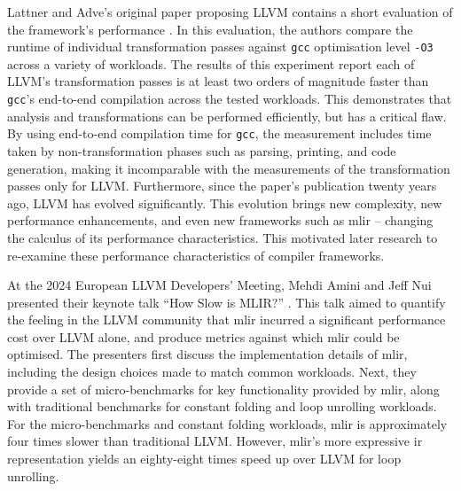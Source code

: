 Lattner and Adve's original paper proposing LLVM contains a short evaluation of the framework's performance \cite[Section 4.1.4]{lattnerLLVMCompilationFramework2004}.
In this evaluation, the authors compare the runtime of individual transformation passes against \texttt{gcc} optimisation level \texttt{-O3} across a variety of workloads.
The results of this experiment \cite[Table 2]{lattnerLLVMCompilationFramework2004} report each of LLVM's transformation passes is at least two orders of magnitude faster than \texttt{gcc}'s end-to-end compilation across the tested workloads. This demonstrates that analysis and transformations can be performed efficiently, but has a critical flaw. By using end-to-end compilation time for \texttt{gcc}, the measurement includes time taken by non-transformation phases such as parsing, printing, and code generation, making it incomparable with the measurements of the transformation passes only for LLVM.
Furthermore, since the paper's publication twenty years ago, LLVM has evolved significantly. This evolution brings new complexity, new performance enhancements, and even new frameworks such as \ac{mlir} -- changing the calculus of its performance characteristics.
This motivated later research to re-examine these performance characteristics of compiler frameworks.

At the 2024 European LLVM Developers' Meeting, Mehdi Amini and Jeff Nui presented their keynote talk ``How Slow is MLIR?'' \cite{aminiHowSlowMLIR2024}.
This talk aimed to quantify the feeling in the LLVM community that \ac{mlir} incurred a significant performance cost over LLVM alone, and produce metrics against which \ac{mlir} could be optimised.
The presenters first discuss the implementation details of \ac{mlir}, including the design choices made to match common workloads.
Next, they provide a set of micro-benchmarks for key functionality provided by \ac{mlir}, along with traditional benchmarks for constant folding and loop unrolling workloads. For the micro-benchmarks and constant folding workloads, \ac{mlir} is approximately four times slower than traditional LLVM. However, \ac{mlir}'s more expressive \ac{ir} representation yields an eighty-eight times speed up over LLVM for loop unrolling.

